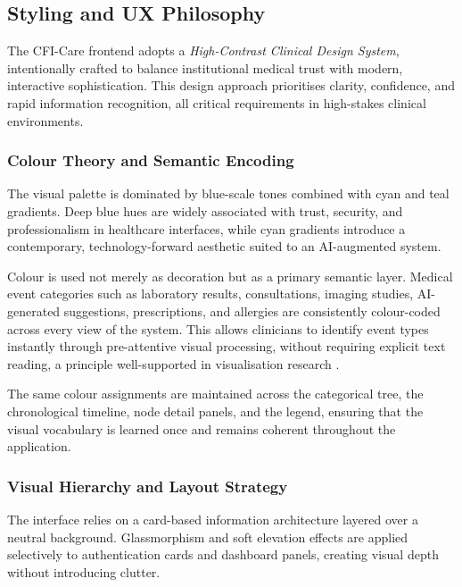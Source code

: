 \subsection{Styling and UX Philosophy}
\label{subsec:styling}

The CFI-Care frontend adopts a \textit{High-Contrast Clinical Design System},
intentionally crafted to balance institutional medical trust with modern,
interactive sophistication. This design approach prioritises clarity,
confidence, and rapid information recognition, all critical requirements in
high-stakes clinical environments.

\subsubsection{Colour Theory and Semantic Encoding}

The visual palette is dominated by blue-scale tones combined with cyan and
teal gradients. Deep blue hues are widely associated with trust, security, and
professionalism in healthcare interfaces, while cyan gradients introduce a
contemporary, technology-forward aesthetic suited to an AI-augmented system.

Colour is used not merely as decoration but as a primary semantic layer.
Medical event categories such as laboratory results, consultations, imaging
studies, AI-generated suggestions, prescriptions, and allergies are
consistently colour-coded across every view of the system. This allows
clinicians to identify event types instantly through pre-attentive visual
processing, without requiring explicit text reading, a principle well-supported
in visualisation research \cite{hospitalDashboards2022,interactiveDashboards2020}.

The same colour assignments are maintained across the categorical tree, the
chronological timeline, node detail panels, and the legend, ensuring that the
visual vocabulary is learned once and remains coherent throughout the
application.

\subsubsection{Visual Hierarchy and Layout Strategy}

The interface relies on a card-based information architecture layered over a
neutral background. Glassmorphism and soft elevation effects are applied
selectively to authentication cards and dashboard panels, creating visual depth
without introducing clutter.

